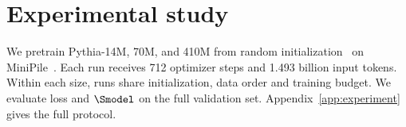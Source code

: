 \section{Experimental study}
\label{sec:experiments}

We pretrain Pythia-14M, 70M, and 410M from random initialization~\citep{biderman2023pythia} on MiniPile~\citep{kaddour2023minipile}. Each run receives 712 optimizer steps and 1.493 billion input tokens. Within each size, runs share initialization, data order and training budget. We evaluate loss and $\Smodel$ on the full validation set. Appendix~\ref{app:experiment} gives the full protocol. %





%
